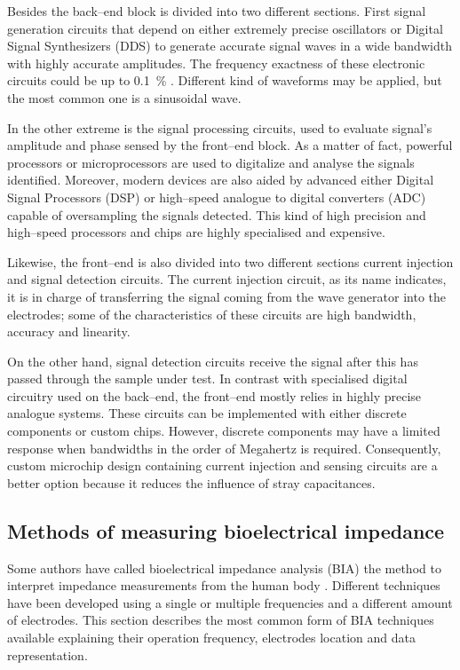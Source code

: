 Besides the back–end block is divided into two different sections. First signal generation circuits that depend on either extremely precise oscillators or Digital Signal Synthesizers (DDS) to generate accurate signal waves in a wide bandwidth with highly accurate amplitudes. The frequency exactness of these electronic circuits could be up to \SI{0.1}{\percent} \cite{ad:AD5930}.  Different kind of waveforms may be applied, but the most common one is a sinusoidal wave. 

In the other extreme is the signal processing circuits, used to evaluate signal’s amplitude and phase sensed by the front–end block.  As a matter of fact, powerful processors or microprocessors are used to digitalize and analyse the signals identified. Moreover, modern devices are also aided by advanced either Digital Signal Processors (DSP) or high–speed analogue to digital converters (ADC) capable of oversampling the signals detected. This kind of high precision and high–speed processors and chips are highly specialised and expensive.

Likewise, the front–end is also divided into two different sections current injection and signal detection circuits. The current injection circuit, as its name indicates, it is in charge of transferring the signal coming from the wave generator into the electrodes; some of the characteristics of these circuits are high bandwidth, accuracy and linearity. 

On the other hand, signal detection circuits receive the signal after this has passed through the sample under test. In contrast with specialised digital circuitry used on the back–end, the front–end mostly relies in highly precise analogue systems. These circuits can be implemented with either discrete components or custom chips. However, discrete components may have a limited response when bandwidths in the order of Megahertz is required. Consequently, custom microchip design containing current injection and sensing circuits are a better option because it reduces the influence of stray capacitances. 

\subsection{Methods of measuring bioelectrical impedance}
\label{section impedance state art.1}
Some authors have called bioelectrical impedance analysis (BIA) the method to interpret impedance measurements from the human body \cite{kyle2004bioelectrical}. Different techniques have been developed using a single or multiple frequencies and a different amount of electrodes. This section describes the most common form of BIA techniques available explaining their operation frequency, electrodes location and data representation.

